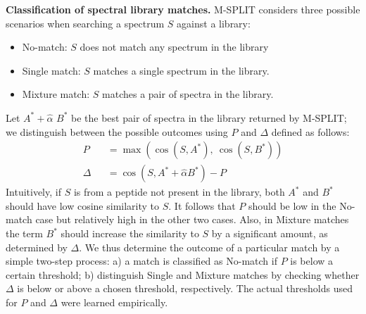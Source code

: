 \documentclass[arial,11pt]{article}
\begin{document}
{\bf Classification of spectral library matches.}
M-SPLIT considers three possible scenarios when searching a spectrum $S$ against a library:
\begin{itemize}
	\item No-match: $S$ does not match any spectrum in the library
	\item Single match: $S$ matches a single spectrum in the library.
	\item Mixture match: $S$ matches a pair of spectra in the library.
\end{itemize}
Let $A^{*}+\hat{\alpha}$ $B^{*}$ be the best pair of spectra in the library returned by M-SPLIT; we distinguish between the possible outcomes using $P$ and $\Delta$
defined as follows:
\begin{eqnarray*}
 P &&= \max( \cos({S}, A^{*}),\  \cos(S, B^{*}) ) \\
 \Delta &&= \cos({S}, A^{*} + \hat{\alpha} B^{*}) - P
\end{eqnarray*} 	
Intuitively, if $S$ is from a peptide not present in the library, both $A^{*}$ and $B^{*}$ should have low cosine similarity
to $S$. It follows that $P$ should be low in the No-match case but relatively high in the other two cases.
Also, in Mixture matches the term $B^{*}$ should increase
the similarity to $S$ by a significant amount, as determined by $\Delta$. We thus determine the outcome of a particular match by a simple two-step process: a) a match is classified as No-match if $P$  is below a certain threshold; b) distinguish Single and Mixture matches by checking whether $\Delta$ is below or above a chosen threshold, respectively. The actual thresholds used for $P$ and $\Delta$ were learned empirically.
\end{document}

